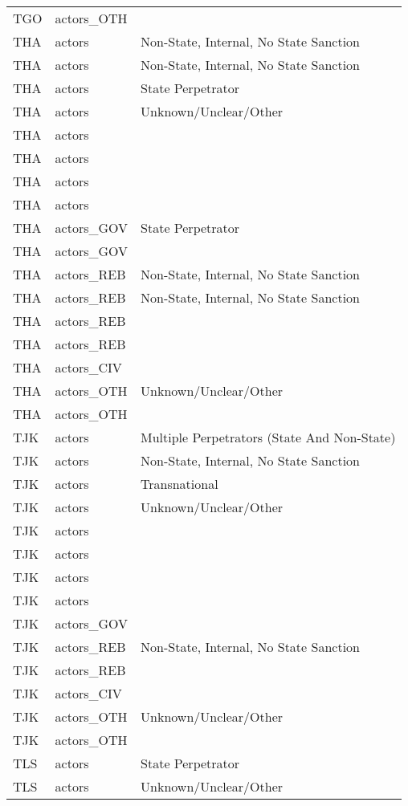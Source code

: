 \begin{table}[ht]
\begin{tabular}{lll}
  TGO & actors\_OTH &  \\ 
  THA & actors & Non-State, Internal, No State Sanction \\ 
  THA & actors & Non-State, Internal, No State Sanction \\ 
  THA & actors & State Perpetrator \\ 
  THA & actors & Unknown/Unclear/Other \\ 
  THA & actors &  \\ 
  THA & actors &  \\ 
  THA & actors &  \\ 
  THA & actors &  \\ 
  THA & actors\_GOV & State Perpetrator \\ 
  THA & actors\_GOV &  \\ 
  THA & actors\_REB & Non-State, Internal, No State Sanction \\ 
  THA & actors\_REB & Non-State, Internal, No State Sanction \\ 
  THA & actors\_REB &  \\ 
  THA & actors\_REB &  \\ 
  THA & actors\_CIV &  \\ 
  THA & actors\_OTH & Unknown/Unclear/Other \\ 
  THA & actors\_OTH &  \\ 
  TJK & actors & Multiple Perpetrators (State And Non-State) \\ 
  TJK & actors & Non-State, Internal, No State Sanction \\ 
  TJK & actors & Transnational \\ 
  TJK & actors & Unknown/Unclear/Other \\ 
  TJK & actors &  \\ 
  TJK & actors &  \\ 
  TJK & actors &  \\ 
  TJK & actors &  \\ 
  TJK & actors\_GOV &  \\ 
  TJK & actors\_REB & Non-State, Internal, No State Sanction \\ 
  TJK & actors\_REB &  \\ 
  TJK & actors\_CIV &  \\ 
  TJK & actors\_OTH & Unknown/Unclear/Other \\ 
  TJK & actors\_OTH &  \\ 
  TLS & actors & State Perpetrator \\ 
  TLS & actors & Unknown/Unclear/Other \\ 

\end{tabular}
\end{table}
